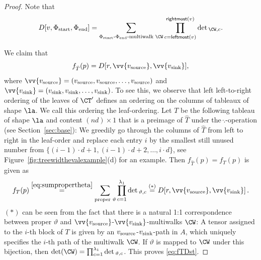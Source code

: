 \begin{proof}
Note that
\begin{equation}\label{def:DII}
D[v,\Phi_\text{start},\Phi_\text{end}] =
\sum_{\Phi_\text{start}\text{-}\Phi_\text{end}\text{-multiwalk } \CW} \prod_{c=\textsf{leftmost}(v)}^{\textsf{rightmost}(v)} \det{}_{\CW,c}.
\end{equation}


We claim that
\begin{equation}\label{eq:fTDst}
f_{\hat T}(p) = D[r, \vv{v_\textup{source}}, \vv{v_{\textup{sink}}}],
\end{equation}
where $\vv{v_{\textup{source}}} = (v_{\textup{source}},v_{\textup{source}},\ldots,v_{\textup{source}})$ and $\vv{v_{\textup{sink}}} = (v_{\textup{sink}},v_{\textup{sink}},\ldots,v_{\textup{sink}})$. To see this,
we observe that left left-to-right ordering of the leaves of $\CT'$ defines an ordering on the columns of tableaux of shape $\la$. We call this ordering the leaf-ordering.
Let $T$ be the following tableau of shape $\la$ and content $(nd) \times 1$ that is a preimage of $\hat T$ under the $\hat.$-operation (see Section~\ref{sec:base}):
We greedily go through the columns of $\hat T$ from left to right in the leaf-order and replace each entry $i$ by the smallest still unused number from $\{(i-1) \cdot d + 1, (i-1) \cdot d + 2, \ldots, i \cdot d\}$, see Figure~\ref{fig:treewidthevalexample}(d) for an example.
Then $f_{\hat{T}}(p) = f_{T}(p)$ is given as
\begin{align*}
    f_{T}(p) \stackrel{\eqref{eq:sumpropertheta}}{=} \sum_{\text{proper\ }\vartheta} \prod_{c = 1}^{\lambda_1}\det{}_{\vartheta, c} \stackrel{(\ast)}{=} D[r, \vv{v_{\textup{source}}}, \vv{v_{\textup{sink}}}]\,.
\end{align*}
$(\ast)$ can be seen from the fact that there is a natural 1:1 correspondence between proper $\vartheta$ and $\vv{v_{\textup{source}}}$-$\vv{v_{\textup{sink}}}$-multiwalks $\CW$: A tensor assigned to the $i$-th block of $T$
is given by an $v_{\textup{source}}$-$v_{\textup{sink}}$-path in $A$, which uniquely specifies the $i$-th path of the multiwalk $\CW$.
If $\vartheta$ is mapped to $\CW$ under this bijection, then $\det(\CW) = \prod_{c = 1}^{\lambda_1}\det{}_{\vartheta, c}$.
This proves \eqref{eq:fTDst}.


\end{proof}
